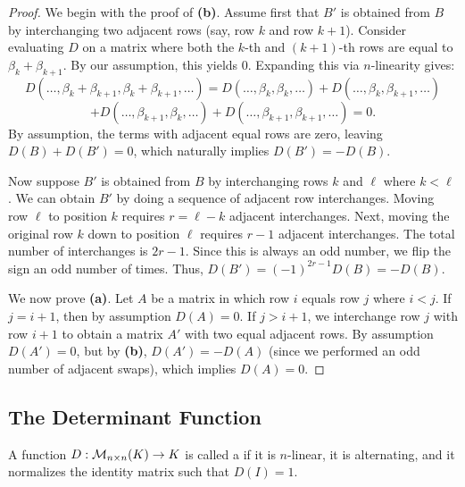 \begin{proof}
  We begin with the proof of \textbf{(b)}. Assume first that $B'$ is obtained from $B$ by interchanging two adjacent rows (say, row $k$ and row $k+1$).
  Consider evaluating $D$ on a matrix where both the $k$-th and $(k+1)$-th rows are equal to $\beta_k + \beta_{k+1}$. By our assumption, this yields $0$.
  Expanding this via $n$-linearity gives:
  \[
  D(\dots, \beta_k + \beta_{k+1}, \beta_k + \beta_{k+1}, \dots) = D(\dots, \beta_k, \beta_k, \dots) + D(\dots, \beta_k, \beta_{k+1}, \dots)
  \]
  \[
  + D(\dots, \beta_{k+1}, \beta_k, \dots) + D(\dots, \beta_{k+1}, \beta_{k+1}, \dots) = 0.
  \]
  By assumption, the terms with adjacent equal rows are zero, leaving $D(B) + D(B') = 0$, which naturally implies $D(B') = -D(B)$.

  Now suppose $B'$ is obtained from $B$ by interchanging rows $k$ and $\ell$ where $k < \ell$. We can obtain $B'$ by doing a sequence of adjacent row interchanges. Moving row $\ell$ to position $k$ requires $r = \ell-k$ adjacent interchanges. Next, moving the original row $k$ down to position $\ell$ requires $r-1$ adjacent interchanges. The total number of interchanges is $2r - 1$. Since this is always an odd number, we flip the sign an odd number of times. Thus, $D(B') = (-1)^{2r-1} D(B) = -D(B)$.

  We now prove \textbf{(a)}. Let $A$ be a matrix in which row $i$ equals row $j$ where $i < j$. If $j = i+1$, then by assumption $D(A) = 0$. If $j > i+1$, we interchange row $j$ with row $i+1$ to obtain a matrix $A'$ with two equal adjacent rows.
  By assumption $D(A') = 0$, but by \textbf{(b)}, $D(A') = -D(A)$ (since we performed an odd number of adjacent swaps), which implies $D(A) = 0$.
\end{proof}

\subsection{The Determinant Function}

\begin{definition}\label{def:determinant_func}
  A function $D : \mathcal{M}_{n \times n}(K) \to K$ is called a  if it is $n$-linear, it is alternating, and it normalizes the identity matrix such that $D(I) = 1$.
\end{definition}

